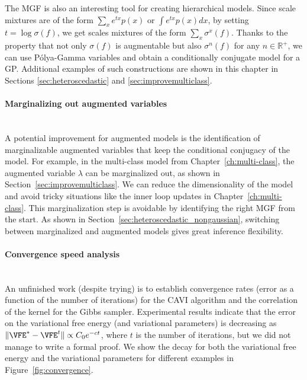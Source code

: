 The \ac{MGF} is also an interesting tool for creating hierarchical models. 
Since scale mixtures are of the form $\sum_{x} e^{tx} p(x)$ or $\int e^{tx}p(x)dx$, by setting $t=\log \sigma(f)$, we get scales mixtures of the form $\sum_x \sigma^x(f)$.
Thanks to the property that not only $\sigma(f)$ is augmentable but also $\sigma^n(f)$ for any $n\in \mathbb{R}^+$, we can use P\'olya-Gamma variables and obtain a conditionally conjugate model for a \ac{GP}.
Additional examples of such constructions are shown in this chapter in Sections \ref{sec:heteroscedastic} and \ref{sec:improvemulticlass}.

\paragraph{Marginalizing out augmented variables}\mbox{}\\
A potential improvement for augmented models is the identification of marginalizable augmented variables that keep the conditional conjugacy of the model.
For example, in the multi-class model from Chapter~\ref{ch:multi-class}, the augmented variable $\lambda$ can be marginalized out, as shown in Section~\ref{sec:improvemulticlass}.
We can reduce the dimensionality of the model and avoid tricky situations like the inner loop updates in Chapter~\ref{ch:multi-class}.
This marginalization step is avoidable by identifying the right \ac{MGF} from the start.
As shown in Section~\ref{sec:heteroscedastic_nongaussian}, switching between marginalized and augmented models gives great inference flexibility.

\paragraph{Convergence speed analysis}\mbox{}\\
An unfinished work (despite trying) is to establish convergence rates (error as a function of the number of iterations) for the \ac{CAVI} algorithm and the correlation of the kernel for the Gibbs sampler.
Experimental results indicate that the error on the variational free energy (and variational parameters) is decreasing as $\|\VFE^{*} - \VFE^{t}\|\propto C_0 e^{-ct}$, where $t$ is the number of iterations, but we did not manage to write a formal proof.
We show the decay for both the variational free energy and the variational parameters for different examples in Figure~\ref{fig:convergence}.


